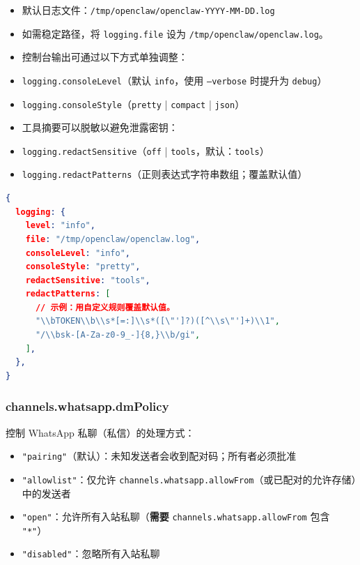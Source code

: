 \begin{itemize}
  \item 默认日志文件：\texttt{/tmp/openclaw/openclaw-YYYY-MM-DD.log}
  \item 如需稳定路径，将 \texttt{logging.file} 设为 \texttt{/tmp/openclaw/openclaw.log}。
  \item 控制台输出可通过以下方式单独调整：
  \item \texttt{logging.consoleLevel}（默认 \texttt{info}，使用 \texttt{--verbose} 时提升为 \texttt{debug}）
  \item \texttt{logging.consoleStyle}（\texttt{pretty} | \texttt{compact} | \texttt{json}）
  \item 工具摘要可以脱敏以避免泄露密钥：
  \item \texttt{logging.redactSensitive}（\texttt{off} | \texttt{tools}，默认：\texttt{tools}）
  \item \texttt{logging.redactPatterns}（正则表达式字符串数组；覆盖默认值）
\end{itemize}


\begin{lstlisting}[language=json]
{
  logging: {
    level: "info",
    file: "/tmp/openclaw/openclaw.log",
    consoleLevel: "info",
    consoleStyle: "pretty",
    redactSensitive: "tools",
    redactPatterns: [
      // 示例：用自定义规则覆盖默认值。
      "\\bTOKEN\\b\\s*[=:]\\s*([\"']?)([^\\s\"']+)\\1",
      "/\\bsk-[A-Za-z0-9_-]{8,}\\b/gi",
    ],
  },
}
\end{lstlisting}


\subsubsection{channels.whatsapp.dmPolicy}


控制 WhatsApp 私聊（私信）的处理方式：

\begin{itemize}
  \item \texttt{"pairing"}（默认）：未知发送者会收到配对码；所有者必须批准
  \item \texttt{"allowlist"}：仅允许 \texttt{channels.whatsapp.allowFrom}（或已配对的允许存储）中的发送者
  \item \texttt{"open"}：允许所有入站私聊（\textbf{需要} \texttt{channels.whatsapp.allowFrom} 包含 \texttt{"*"}）
  \item \texttt{"disabled"}：忽略所有入站私聊
\end{itemize}



